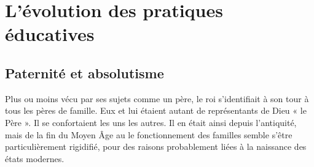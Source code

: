 
\chapter{L'évolution des pratiques éducatives}


 \section{Paternité et absolutisme}


Plus ou moins vécu par ses sujets comme un père, le roi s'identifiait à son tour à tous les pères de famille. Eux et lui étaient autant de représentants de Dieu « le Père ». Il se confortaient les uns les autres. Il en était ainsi depuis l'antiquité, mais de la fin du Moyen Âge au  le fonctionnement des familles semble s'être particulièrement rigidifié, pour des raisons probablement liées à la naissance des états modernes. 

